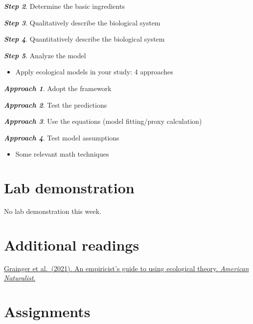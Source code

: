 \documentclass[
]{book}
\providecommand{\tightlist}{%
  \setlength{\itemsep}{0pt}\setlength{\parskip}{0pt}}
\begin{document}
{\textbf{\emph{Step 2}}. Determine the basic ingredients}

{\textbf{\emph{Step 3}}. Qualitatively describe the biological system}

{\textbf{\emph{Step 4}}. Quantitatively describe the biological system}

{\textbf{\emph{Step 5}}. Analyze the model}

\begin{itemize}
\tightlist
\item
  Apply ecological models in your study: 4 approaches
\end{itemize}

{\textbf{\emph{Approach 1}}. Adopt the framework}

{\textbf{\emph{Approach 2}}. Test the predictions}

{\textbf{\emph{Approach 3}}. Use the equations (model fitting/proxy calculation)}

{\textbf{\emph{Approach 4}}. Test model assumptions}

\begin{itemize}
\tightlist
\item
  Some relevant math techniques
\end{itemize}

\hypertarget{lab-demonstration}{%
\section*{Lab demonstration}\label{lab-demonstration}}

No lab demonstration this week.

\hypertarget{additional-readings}{%
\section*{Additional readings}\label{additional-readings}}

\href{./Additional\%20readings/Week1_Reading_Grainger_et_al_2021_AmNat.pdf}{Grainger et al.~(2021). An empiricist's guide to using ecological theory. \emph{American Naturalist}.}

\hypertarget{assignments}{%
\section*{Assignments}\label{assignments}}
\end{document}
